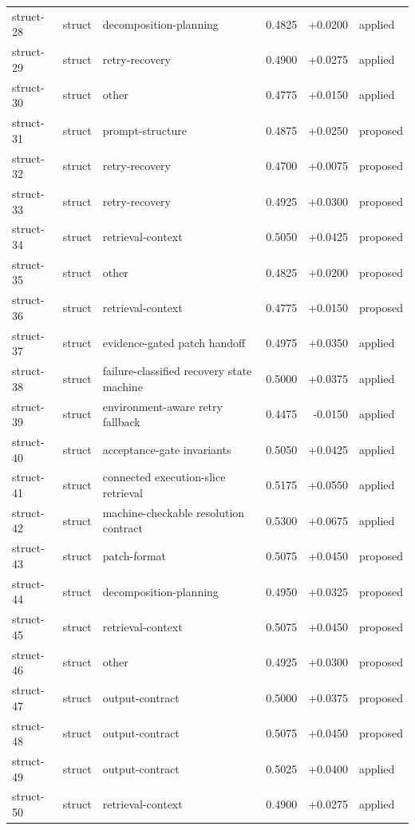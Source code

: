 \begin{center}
\begin{longtable}{llp{5.2cm}rrl}
struct-28 & struct & decomposition-planning & 0.4825 & +0.0200 & applied \\
struct-29 & struct & retry-recovery & 0.4900 & +0.0275 & applied \\
struct-30 & struct & other & 0.4775 & +0.0150 & applied \\
struct-31 & struct & prompt-structure & 0.4875 & +0.0250 & proposed \\
struct-32 & struct & retry-recovery & 0.4700 & +0.0075 & proposed \\
struct-33 & struct & retry-recovery & 0.4925 & +0.0300 & proposed \\
struct-34 & struct & retrieval-context & 0.5050 & +0.0425 & proposed \\
struct-35 & struct & other & 0.4825 & +0.0200 & proposed \\
struct-36 & struct & retrieval-context & 0.4775 & +0.0150 & proposed \\
struct-37 & struct & evidence-gated patch handoff & 0.4975 & +0.0350 & applied \\
struct-38 & struct & failure-classified recovery state machine & 0.5000 & +0.0375 & applied \\
struct-39 & struct & environment-aware retry fallback & 0.4475 & -0.0150 & applied \\
struct-40 & struct & acceptance-gate invariants & 0.5050 & +0.0425 & applied \\
struct-41 & struct & connected execution-slice retrieval & 0.5175 & +0.0550 & applied \\
struct-42 & struct & machine-checkable resolution contract & 0.5300 & +0.0675 & applied \\
struct-43 & struct & patch-format & 0.5075 & +0.0450 & proposed \\
struct-44 & struct & decomposition-planning & 0.4950 & +0.0325 & proposed \\
struct-45 & struct & retrieval-context & 0.5075 & +0.0450 & proposed \\
struct-46 & struct & other & 0.4925 & +0.0300 & proposed \\
struct-47 & struct & output-contract & 0.5000 & +0.0375 & proposed \\
struct-48 & struct & output-contract & 0.5075 & +0.0450 & proposed \\
struct-49 & struct & output-contract & 0.5025 & +0.0400 & applied \\
struct-50 & struct & retrieval-context & 0.4900 & +0.0275 & applied \\

\end{longtable}
\end{center}
